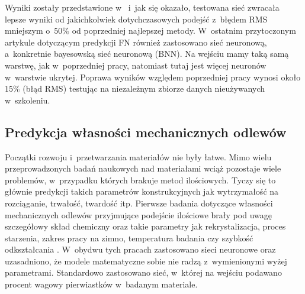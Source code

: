 Wyniki zostały przedstawione w~\cite{Vitek03.II} i~jak się okazało, testowana sieć zwracała lepsze wyniki od jakichkolwiek dotychczasowych podejść z~błędem RMS mniejszym o~$50\%$ od poprzedniej najlepszej metody. 
    W~ostatnim przytoczonym artykule dotyczącym predykcji FN \cite{Vasudevan13} również zastosowano sieć neuronową, a~konkretnie bayesowską sieć neuronową (BNN). Na wejściu mamy taką samą warstwę, jak w~poprzedniej pracy, natomiast tutaj jest więcej neuronów w~warstwie ukrytej. Poprawa wyników względem poprzedniej pracy wynosi około $15\%$ (błąd RMS) testując na niezależnym zbiorze danych nieużywanych w~szkoleniu.

\subsection{Predykcja własności mechanicznych odlewów}
\label{sub:predykcja.1}

Początki rozwoju i~przetwarzania materiałów nie były łatwe. Mimo wielu przeprowadzonych badań naukowych nad materiałami wciąż pozostaje wiele problemów, w~przypadku których brakuje metod ilościowych. Tyczy się to głównie predykcji takich parametrów konstrukcyjnych jak wytrzymałość na rozciąganie, trwałość, twardość itp. Pierwsze badania dotyczące własności mechanicznych odlewów przyjmujące podejście ilościowe brały pod uwagę szczegółowy skład chemiczny oraz takie parametry jak rekrystalizacja, proces starzenia, zakres pracy na zimno, temperatura badania czy szybkość odkształcania \cite{Bhadeshia07, Badmos13}. W~obydwu tych pracach zastosowano sieci neuronowe oraz uzasadniono, że modele matematyczne sobie nie radzą z~wymienionymi wyżej parametrami. Standardowo zastosowano sieć, w~której na wejściu podawano procent wagowy pierwiastków w~badanym materiale. 

